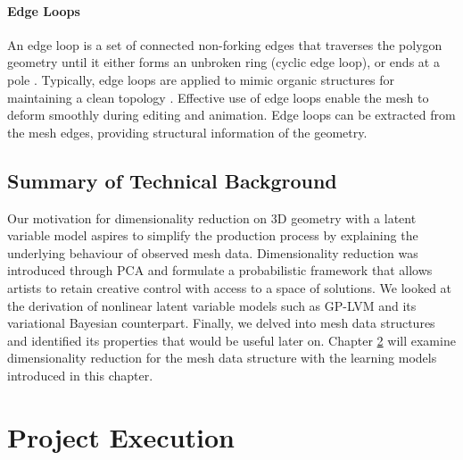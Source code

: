 \documentclass[ %
author={Dillon Keith Diep},
supervisor={Dr. Carl Henrik Ek},
degree={MEng},
title={ART-CG Hair:},
subtitle={Assisted Real-time Content Generation of Stylised Virtual Hair},
type={Research},
year={2017} ]{dissertation}
\begin{document}
\subsubsection{Edge Loops}
An edge loop is a set of connected non-forking edges that traverses the polygon geometry until it either forms an unbroken ring (cyclic edge loop), or ends at a pole \cite[p.93]{blenderstudio}. Typically, edge loops are applied to mimic organic structures for maintaining a clean topology \cite[pp.10-12]{edgeloops}. Effective use of edge loops enable the mesh to deform smoothly during editing and animation. Edge loops can be extracted from the mesh edges, providing structural information of the geometry.

\section{Summary of Technical Background}
Our motivation for dimensionality reduction on 3D geometry with a latent variable model aspires to simplify the production process by explaining the underlying behaviour of observed mesh data.
Dimensionality reduction was introduced through PCA and formulate a probabilistic framework that allows artists to retain creative control with access to a space of solutions.
We looked at the derivation of nonlinear latent variable models such as GP-LVM and its variational Bayesian counterpart.
Finally, we delved into mesh data structures and identified its properties that would be useful later on.
Chapter \ref{chap:execution} will examine dimensionality reduction for the mesh data structure with the learning models introduced in this chapter.


\chapter{Project Execution}
\label{chap:execution}
\end{document}
